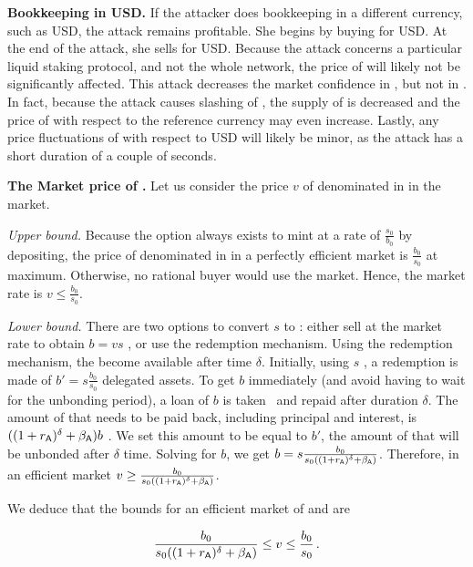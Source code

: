 \noindent
\textbf{Bookkeeping in USD.}
If the attacker does bookkeeping in a different currency,
such as USD, the attack remains profitable. She begins by buying
\asset for USD. At the end of the attack, she sells \asset for USD.
Because the attack concerns a particular liquid staking protocol, and
not the whole \asset network, the price of \asset will likely not
be significantly affected.
This attack decreases the market confidence in \stasset,
but not in \asset.
In fact, because
the attack causes slashing of \asset, the supply of \asset is decreased
and the price of \asset with respect to the reference currency may
even increase.
Lastly, any price fluctuations of \asset with respect to USD will likely be
minor, as the attack has a short duration of a couple of seconds.

\noindent
\textbf{The Market price of \stasset.}\label{sec:stasset-price}
Let us consider the price $v$ of \stasset denominated in \asset in the market.

\emph{Upper bound.}
Because the option always exists to mint at a rate of $\frac{s_0}{b_0}$ by
depositing, the price of \stasset denominated in \asset in a perfectly
efficient market is $\frac{b_0}{s_0}$ at maximum. Otherwise, no
rational buyer would use the market. Hence, the market rate is
$v \leq \frac{b_0}{s_0}$.

\emph{Lower bound.}
There are two options to convert $s$ \stasset to \asset: either sell
at the market rate to obtain $b = v s$ \asset, or use the redemption mechanism.
Using the redemption mechanism, the \assets become available after
time $\delta$.
Initially, using $s$ \stasset, a redemption is made of $b' = s \frac{b_0}{s_0}$
delegated assets. To get $b$ \asset immediately (and avoid having to wait
for the unbonding period), a loan of $b$ \asset is taken~\cite[p.~13]{liquid-staking-report} and
repaid after duration $\delta$.
The amount of \asset that needs to be paid back,
including principal and interest, is $((1 + r_{\textsf{A}})^\delta + \beta_{\textsf{A}})b$ \asset.
We set this amount to be equal to $b'$, the amount of \assets that will be
unbonded after $\delta$ time. Solving for $b$, we get
$b = s \frac{b_0}{s_0 ((1 + r_{\textsf{A}})^\delta + \beta_{\textsf{A}})}$.
Therefore, in an efficient market $v \geq \frac{b_0}{s_0 ((1 + r_{\textsf{A}})^\delta + \beta_{\textsf{A}})}$.

We deduce that the bounds for an efficient market of \asset and \stasset are

\[
  \frac{b_0}{s_0 ((1 + r_{\textsf{A}})^\delta + \beta_{\textsf{A}})} \leq v \leq \frac{b_0}{s_0}\,.
\]

